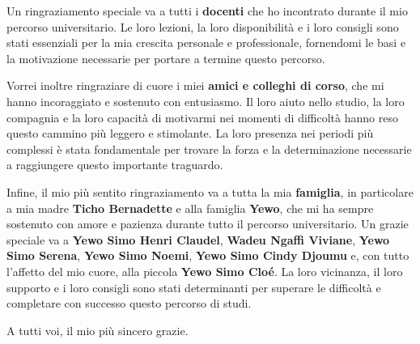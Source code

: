 \documentclass[openany]{theme/uniprthesis}
\begin{document}
Un ringraziamento speciale va a tutti i \textbf{docenti} che ho incontrato durante il mio percorso universitario. Le loro lezioni, la loro disponibilità e i loro consigli sono stati essenziali per la mia crescita personale e professionale, fornendomi le basi e la motivazione necessarie per portare a termine questo percorso.

Vorrei inoltre ringraziare di cuore i miei \textbf{amici e colleghi di corso}, che mi hanno incoraggiato e sostenuto con entusiasmo. Il loro aiuto nello studio, la loro compagnia e la loro capacità di motivarmi nei momenti di difficoltà hanno reso questo cammino più leggero e stimolante. La loro presenza nei periodi più complessi è stata fondamentale per trovare la forza e la determinazione necessarie a raggiungere questo importante traguardo.

Infine, il mio più sentito ringraziamento va a tutta la mia \textbf{famiglia}, in particolare a mia madre \textbf{Ticho Bernadette} e alla famiglia \textbf{Yewo}, che mi ha sempre sostenuto con amore e pazienza durante tutto il percorso universitario. Un grazie speciale va a \textbf{Yewo Simo Henri Claudel}, \textbf{Wadeu Ngaffi Viviane}, \textbf{Yewo Simo Serena}, \textbf{Yewo Simo Noemi}, \textbf{Yewo Simo Cindy Djoumu} e, con tutto l'affetto del mio cuore, alla piccola \textbf{Yewo Simo Cloé}. La loro vicinanza, il loro supporto e i loro consigli sono stati determinanti per superare le difficoltà e completare con successo questo percorso di studi.

\bigskip
\noindent A tutti voi, il mio più sincero grazie.
\end{document}
